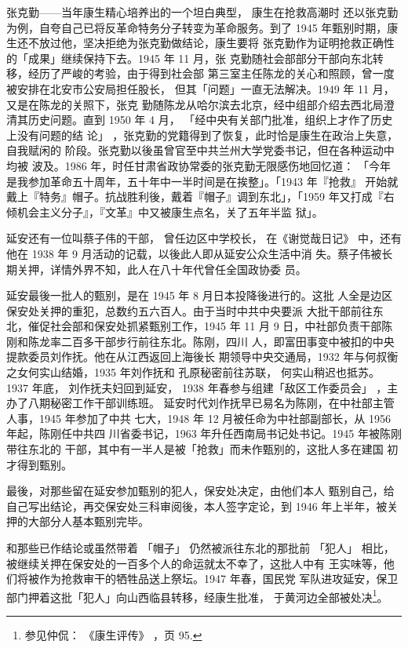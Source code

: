 张克勤——当年康生精心培养出的一个坦白典型，
康生在抢救高潮时
还以张克勤为例，自夸自己已将反革命特务分子转变为革命服务。到了
1945 年甄别时期，康生还不放过他，坚决拒绝为张克勤做结论，康生要将
张克勤作为证明抢救正确性的「成果」继续保持下去。1945 年 11 月，张
克勤随社会部部分干部向东北转移，经历了严峻的考验，由于得到社会部
第三室主任陈龙的关心和照顾，曾一度被安排在北安市公安局担任股长，
但其「问题」一直无法解决。1949 年 11 月，又是在陈龙的关照下，张克
勤随陈龙从哈尔滨去北京，经中组部介绍去西北局澄清其历史问题。直到
1950 年 4 月，
「经中央有关部门批准，组织上才作了历史上没有问题的结
论」
，张克勤的党籍得到了恢复，此时恰是康生在政治上失意，自我赋闲的
阶段。张克勤以後虽曾官至中共兰州大学党委书记，但在各种运动中均被
波及。1986 年，时任甘肃省政协常委的张克勤无限感伤地回忆道：
「今年
是我参加革命五十周年，五十年中一半时间是在挨整」。「1943 年『抢救』
开始就戴上『特务』帽子。抗战胜利後，戴着『帽子』调到东北」，「1959
年又打成『右倾机会主义分子』，『文革』中又被康生点名，关了五年半监
狱」。

延安还有一位叫蔡子伟的干部，
曾任边区中学校长， 在《谢觉哉日记》
中，还有他在 1938 年 9 月活动的记载，以後此人即从延安公众生活中消
失。蔡子伟被长期关押，详情外界不知，此人在八十年代曾任全国政协委
员。

延安最後一批人的甄别，是在 1945 年 8 月日本投降後进行的。这批
人全是边区保安处关押的重犯，总数约五六百人。由于当时中共中央要派
大批干部前往东北，催促社会部和保安处抓紧甄别工作，1945 年 11 月 9
日，中社部负责干部陈刚和陈龙率二百多干部步行前往东北。陈刚，四川
人，即富田事变中被扣的中央提款委员刘作抚。他在从江西返回上海後长
期领导中央交通局，1932 年与何叔衡之女何实山结婚，1935 年刘作抚和
孔原秘密前往苏联，
何实山稍迟也抵苏。
1937 年底，
刘作抚夫妇回到延安，
1938 年春参与组建「敌区工作委员会」
，主办了八期秘密工作干部训练班。
延安时代刘作抚早已易名为陈刚，在中社部主管人事，1945 年参加了中共
七大，1948 年 12 月被任命为中社部副部长，从 1956 年起，陈刚任中共四
川省委书记，1963 年升任西南局书记处书记。1945 年被陈刚带往东北的
干部，其中有一半人是被「抢救」而未作甄别的，这批人多在建国
初才得到甄别。

最後，对那些留在延安参加甄别的犯人，保安处决定，由他们本人
甄别自己，给自己写出结论，再交保安处三科审阅後，本人签字定论，到
1946 年上半年，被关押的大部分人基本甄别完毕。

和那些已作结论或虽然带着
「帽子」
仍然被派往东北的那批前
「犯人」
相比，被继续关押在保安处的一百多个人的命运就太不幸了，这批人中有
王实味等，他们将被作为抢救审干的牺牲品送上祭坛。1947 年春，国民党
军队进攻延安，保卫部门押着这批「犯人」向山西临县转移，经康生批准，
于黄河边全部被处决\footnote{参见仲侃：
《康生评传》
，页 95.}。

